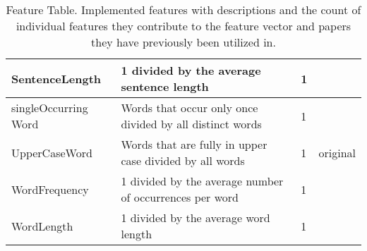 \begin{table}[h]
\begin{center}
\begin{tabular}{p{2.6cm}|p{6cm}|p{1.2cm}|p{1.2cm}}
    SentenceLength			& 1 divided by the average sentence length									& 1 				& \cite{de2001mining}\\ \hline
    singleOccurring Word	& Words that occur only once divided by all distinct words					& 1					& \cite{madigan2005author} \cite{narayanan2012feasibility}\\ \hline
    UpperCaseWord			& Words that are fully in upper case divided by all words					& 1					& original\\ \hline
    WordFrequency			& 1 divided by the average number of occurrences per word					& 1					& \cite{madigan2005author} \cite{narayanan2012feasibility}\\ \hline
    WordLength				& 1 divided by the average word length										& 1					& \cite{argamon2003style} \cite{narayanan2012feasibility}\\
    \end{tabular}
    \end{center}
	\caption{Feature Table. Implemented features with descriptions and the count of individual features they contribute to the feature vector and papers they have previously been utilized in.}
	\label{tab:featureTable}
\end{table}
